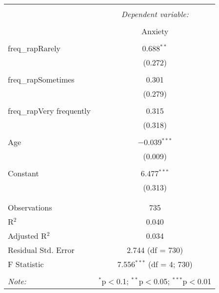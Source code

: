 \documentclass{article}
\begin{document}
\begin{table}[!htbp] \centering 
  \caption{} 
  \label{} 
\begin{tabular}{@{\extracolsep{5pt}}lc} 
\\[-1.8ex]\hline 
\hline \\[-1.8ex] 
 & \multicolumn{1}{c}{\textit{Dependent variable:}} \\ 
\cline{2-2} 
\\[-1.8ex] & Anxiety \\ 
\hline \\[-1.8ex] 
 freq\_rapRarely & 0.688$^{**}$ \\ 
  & (0.272) \\ 
  & \\ 
 freq\_rapSometimes & 0.301 \\ 
  & (0.279) \\ 
  & \\ 
 freq\_rapVery frequently & 0.315 \\ 
  & (0.318) \\ 
  & \\ 
 Age & $-$0.039$^{***}$ \\ 
  & (0.009) \\ 
  & \\ 
 Constant & 6.477$^{***}$ \\ 
  & (0.313) \\ 
  & \\ 
\hline \\[-1.8ex] 
Observations & 735 \\ 
R$^{2}$ & 0.040 \\ 
Adjusted R$^{2}$ & 0.034 \\ 
Residual Std. Error & 2.744 (df = 730) \\ 
F Statistic & 7.556$^{***}$ (df = 4; 730) \\ 
\hline 
\hline \\[-1.8ex] 
\textit{Note:}  & \multicolumn{1}{r}{$^{*}$p$<$0.1; $^{**}$p$<$0.05; $^{***}$p$<$0.01} \\ 
\end{tabular} 
\end{table}
\end{document}
